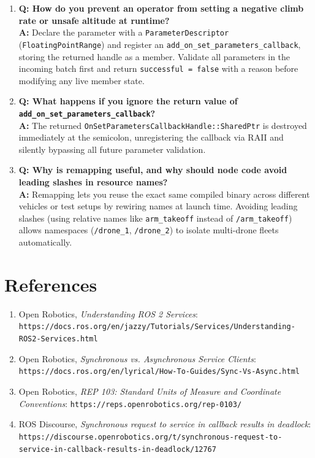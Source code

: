 \documentclass{article}
\begin{document}
\begin{enumerate}
    \item \textbf{Q: How do you prevent an operator from setting a negative climb rate or unsafe altitude at runtime?} \\
    \textbf{A:} Declare the parameter with a \texttt{ParameterDescriptor} (\texttt{FloatingPointRange}) and register an \texttt{add\_on\_set\_\allowbreak parameters\_callback}, storing the returned handle as a member. Validate all parameters in the incoming batch first and return \texttt{successful = false} with a reason before modifying any live member state.

    \item \textbf{Q: What happens if you ignore the return value of \texttt{add\_on\_set\_\allowbreak parameters\_callback}?} \\
    \textbf{A:} The returned \texttt{OnSetParametersCallbackHandle::SharedPtr} is destroyed immediately at the semicolon, unregistering the callback via RAII and silently bypassing all future parameter validation.

    \item \textbf{Q: Why is remapping useful, and why should node code avoid leading slashes in resource names?} \\
    \textbf{A:} Remapping lets you reuse the exact same compiled binary across different vehicles or test setups by rewiring names at launch time. Avoiding leading slashes (using relative names like \texttt{arm\_takeoff} instead of \texttt{/arm\_takeoff}) allows namespaces (\texttt{/drone\_1}, \texttt{/drone\_2}) to isolate multi-drone fleets automatically.
\end{enumerate}

\section{References}
\begin{enumerate}
    \item Open Robotics, \textit{Understanding ROS 2 Services}: 
    \newline \texttt{https://docs.ros.org/en/jazzy/Tutorials/Services/Understanding-ROS2-Services.html}
    \item Open Robotics, \textit{Synchronous vs. Asynchronous Service Clients}: 
    \newline \texttt{https://docs.ros.org/en/lyrical/How-To-Guides/Sync-Vs-Async.html}
    \item Open Robotics, \textit{REP 103: Standard Units of Measure and Coordinate Conventions}: 
    \newline \texttt{https://reps.openrobotics.org/rep-0103/}
    \item ROS Discourse, \textit{Synchronous request to service in callback results in deadlock}: 
    \newline \texttt{https://discourse.openrobotics.org/t/synchronous-request-to-service-in-callback-results-in-deadlock/12767}
\end{enumerate}
\end{document}

